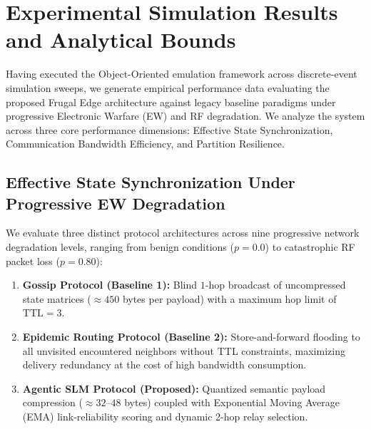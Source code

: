 \section{Experimental Simulation Results and Analytical Bounds}

Having executed the Object-Oriented emulation framework across discrete-event simulation sweeps, we generate empirical performance data evaluating the proposed Frugal Edge architecture against legacy baseline paradigms under progressive Electronic Warfare (EW) and RF degradation. We analyze the system across three core performance dimensions: Effective State Synchronization, Communication Bandwidth Efficiency, and Partition Resilience.

\subsection{Effective State Synchronization Under Progressive EW Degradation}
We evaluate three distinct protocol architectures across nine progressive network degradation levels, ranging from benign conditions ($p=0.0$) to catastrophic RF packet loss ($p=0.80$):
\begin{enumerate}
    \item \textbf{Gossip Protocol (Baseline 1):} Blind $1$-hop broadcast of uncompressed state matrices ($\approx 450$ bytes per payload) with a maximum hop limit of $\text{TTL}=3$.
    \item \textbf{Epidemic Routing Protocol (Baseline 2):} Store-and-forward flooding to all unvisited encountered neighbors without TTL constraints, maximizing delivery redundancy at the cost of high bandwidth consumption.
    \item \textbf{Agentic SLM Protocol (Proposed):} Quantized semantic payload compression ($\approx 32\text{--}48$ bytes) coupled with Exponential Moving Average (EMA) link-reliability scoring and dynamic 2-hop relay selection.
\end{enumerate}

